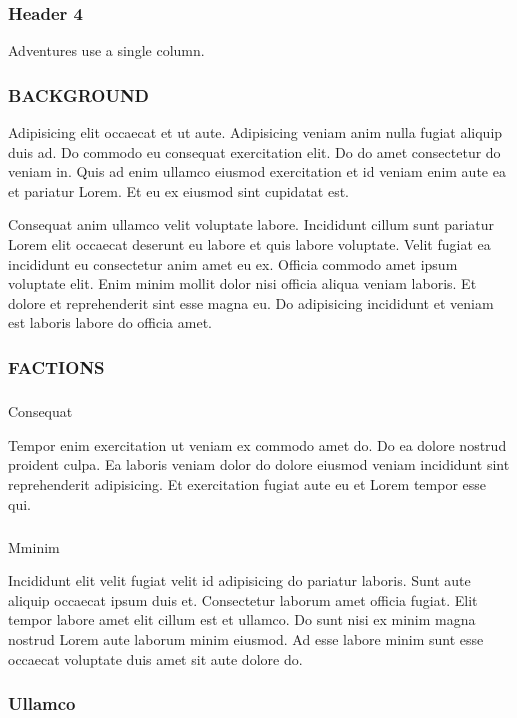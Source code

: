 \documentclass[
  10pt,
  titlepage=firstiscover,
  toc=flat,
  twoside]{scrreprt}
\makeatletter
\let\oldsubparagraph\subparagraph
\renewcommand{\subparagraph}{
    \@ifstar
      \xxxSubParagraphStar
      \xxxSubParagraphNoStar
  }
\newcommand{\xxxSubParagraphStar}[1]{\oldsubparagraph*{#1}\mbox{}}
\newcommand{\xxxSubParagraphNoStar}[1]{\oldsubparagraph{#1}\mbox{}}
\makeatother
\begin{document}
\subsubsection{Header 4}\label{header-4}

Adventures use a single column.

\subsubsection{BACKGROUND}\label{background}

Adipisicing elit occaecat et ut aute. Adipisicing veniam anim nulla
fugiat aliquip duis ad. Do commodo eu consequat exercitation elit. Do do
amet consectetur do veniam in. Quis ad enim ullamco eiusmod exercitation
et id veniam enim aute ea et pariatur Lorem. Et eu ex eiusmod sint
cupidatat est.

Consequat anim ullamco velit voluptate labore. Incididunt cillum sunt
pariatur Lorem elit occaecat deserunt eu labore et quis labore
voluptate. Velit fugiat ea incididunt eu consectetur anim amet eu ex.
Officia commodo amet ipsum voluptate elit. Enim minim mollit dolor nisi
officia aliqua veniam laboris. Et dolore et reprehenderit sint esse
magna eu. Do adipisicing incididunt et veniam est laboris labore do
officia amet.

\subsubsection{FACTIONS}\label{factions}

\subparagraph{Consequat}\label{consequat}

Tempor enim exercitation ut veniam ex commodo amet do. Do ea dolore
nostrud proident culpa. Ea laboris veniam dolor do dolore eiusmod veniam
incididunt sint reprehenderit adipisicing. Et exercitation fugiat aute
eu et Lorem tempor esse qui.

\subparagraph{Mminim}\label{mminim}

Incididunt elit velit fugiat velit id adipisicing do pariatur laboris.
Sunt aute aliquip occaecat ipsum duis et. Consectetur laborum amet
officia fugiat. Elit tempor labore amet elit cillum est et ullamco. Do
sunt nisi ex minim magna nostrud Lorem aute laborum minim eiusmod. Ad
esse labore minim sunt esse occaecat voluptate duis amet sit aute dolore
do.

\subsubsection{Ullamco}\label{ullamco}
\end{document}
